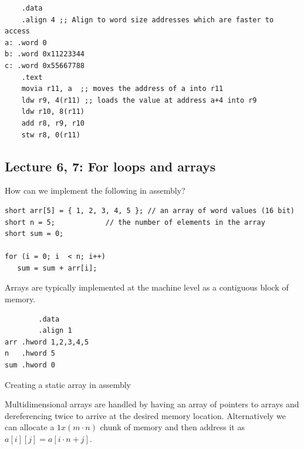 \documentclass[../notes.tex]{subfiles}
\begin{document}
\begin{listing}[H]
\begin{verbatim}
	.data
	.align 4 ;; Align to word size addresses which are faster to access
a: .word 0
b: .word 0x11223344
c: .word 0x55667788
	.text
	movia r11, a  ;; moves the address of a into r11
	ldw r9, 4(r11) ;; loads the value at address a+4 into r9
	ldw r10, 8(r11)
	add r8, r9, r10
	stw r8, 0(r11)
\end{verbatim}
\end{listing}






\subsection{Lecture 6, 7: For loops and arrays}

How can we implement the following in assembly?

\begin{listing}[H]
\begin{verbatim}
short arr[5] = { 1, 2, 3, 4, 5 }; // an array of word values (16 bit)
short n = 5;            // the number of elements in the array
short sum = 0;
 
for (i = 0; i  < n; i++)
   sum = sum + arr[i];
\end{verbatim}
\end{listing}


Arrays are typically implemented at the machine level as a contiguous block of memory.

\begin{listing}[H]
	\begin{verbatim}
		.data
		.align 1
arr .hword 1,2,3,4,5
n   .hword 5
sum .hword 0
	\end{verbatim}
	\caption{Creating a static array in assembly}
\end{listing}

Multidimensional arrays are handled by having an array of pointers to arrays and dereferencing twice to arrive at the desired memory location.
Alternatively we can allocate a $ 1x(m \cdot  n) $ chunk of memory and then address it as $ a[i][j] = a[i \cdot n + j] $.
\end{document}
